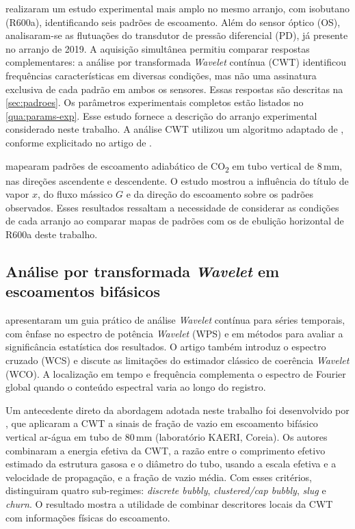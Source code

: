  realizaram um estudo experimental mais amplo no mesmo arranjo,
com isobutano (R600a), identificando seis padrões de escoamento. Além do
sensor óptico (OS), analisaram-se as flutuações do transdutor de pressão diferencial
(PD), já presente no arranjo de 2019. A aquisição simultânea permitiu comparar
respostas complementares: a análise por transformada \textit{Wavelet} contínua (CWT)
identificou frequências características
em diversas condições, mas não uma assinatura exclusiva de cada padrão em ambos
os sensores. Essas respostas são descritas na \autoref{sec:padroes}. Os parâmetros
experimentais completos estão listados no \autoref{qua:params-exp}.
Esse estudo fornece a descrição do arranjo experimental considerado neste trabalho.
A análise CWT utilizou um algoritmo adaptado de ,
conforme explicitado no artigo de .

 mapearam padrões de escoamento adiabático de
CO\textsubscript{2} em tubo vertical de 8\,mm, nas direções ascendente e
descendente. O estudo mostrou a influência do título de vapor $x$, do fluxo mássico $G$
e da direção do escoamento sobre os padrões observados. Esses resultados
ressaltam a necessidade de considerar as condições de cada arranjo ao comparar
mapas de padrões com os de ebulição horizontal de R600a deste trabalho.

\subsection{Análise por transformada \textit{Wavelet} em escoamentos bifásicos}\label{sec:rev-wavelet}

 apresentaram um guia prático de análise \textit{Wavelet} contínua
para séries temporais, com ênfase no espectro de potência \textit{Wavelet} (WPS) e em
métodos para avaliar a significância estatística dos resultados. O artigo também introduz
o espectro cruzado (WCS) e discute as limitações do estimador clássico de coerência
\textit{Wavelet} (WCO). A localização em tempo e frequência complementa o espectro
de Fourier global quando o conteúdo espectral varia ao longo do registro.

Um antecedente direto da abordagem adotada neste trabalho foi desenvolvido por
, que aplicaram a CWT a sinais de fração de vazio em escoamento
bifásico vertical ar-água em tubo de 80\,mm (laboratório KAERI, Coreia). Os autores
combinaram a energia efetiva da CWT, a razão entre o comprimento efetivo estimado
da estrutura gasosa e o diâmetro do tubo, usando a escala efetiva e a velocidade de propagação,
e a fração de vazio média.
Com esses critérios, distinguiram quatro sub-regimes: \textit{discrete bubbly},
\textit{clustered/cap bubbly}, \textit{slug} e \textit{churn}. O resultado
mostra a utilidade de combinar descritores locais da CWT com informações
físicas do escoamento.


